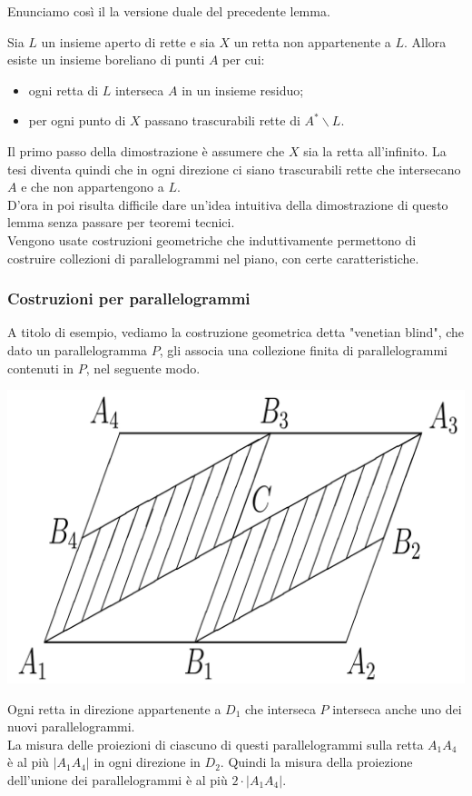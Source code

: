 \documentclass[11pt]{beamer} %
\newcommand{\<}{\langle}
\renewcommand{\>}{\rangle}
\theoremstyle{theorem}
\theoremstyle{theorem}
\theoremstyle{theorem}
\theoremstyle{theorem}
\theoremstyle{theorem}
\begin{document}
\begin{frame}
	Enunciamo così il la versione duale del precedente lemma.
	
	\begin{lemma}{2}
	Sia $L$ un insieme aperto di rette e sia $X$ un retta non appartenente a $L$. Allora esiste un insieme boreliano di punti $A$ per cui:\\
	\begin{itemize}
		\item ogni retta di $L$ interseca $A$ in un insieme residuo;\\
		\item per ogni punto di $X$ passano trascurabili rette di $A^{*} \backslash L$.\\
	\end{itemize}

	\medskip
	
	\end{lemma}
	\pause
	Il primo passo della dimostrazione è assumere che $X$ sia la retta all'infinito. La tesi diventa quindi che in ogni direzione ci siano trascurabili rette che intersecano $A$ e che non appartengono a $L$.\\
	\pause
	D'ora in poi risulta difficile dare un'idea intuitiva della dimostrazione di questo lemma senza passare per teoremi tecnici.\\
	\pause
	Vengono usate costruzioni geometriche che induttivamente permettono di costruire collezioni di parallelogrammi nel piano, con certe caratteristiche.\\
\end{frame}	



\begin{frame}[fragile]
	\frametitle{Costruzioni per parallelogrammi}
		A titolo di esempio, vediamo la costruzione geometrica detta "venetian blind", che dato un parallelogramma $P$, gli associa una collezione finita di parallelogrammi contenuti in $P$, nel seguente modo.
	\pause
	\begin{center}
		\includegraphics[width=0.4\columnwidth]{passo1.png}
	\end{center}
	\pause
	Ogni retta in direzione appartenente a $D_1$ che interseca $P$ interseca anche uno dei nuovi parallelogrammi.\\
	\pause
	La misura delle proiezioni di ciascuno di questi parallelogrammi sulla retta $A_{1} A_{4}$ è al più $\left|A_{1} A_{4}\right|$ in ogni direzione in $D_2$. \pause Quindi la misura della proiezione dell'unione dei parallelogrammi è al più $2 \cdot\left|A_{1} A_{4}\right|$.\\
\end{frame}
\end{document}
